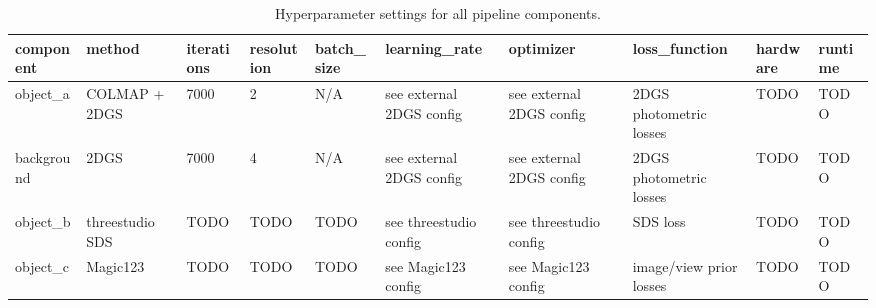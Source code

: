 \begin{table}[htbp]
\centering
\small
\begin{tabular}{llllllllll}
\hline
component & method & iterations & resolution & batch\_size & learning\_rate & optimizer & loss\_function & hardware & runtime \\
\hline
object\_a & COLMAP + 2DGS & 7000 & 2 & N/A & see external 2DGS config & see external 2DGS config & 2DGS photometric losses & TODO & TODO \\
background & 2DGS & 7000 & 4 & N/A & see external 2DGS config & see external 2DGS config & 2DGS photometric losses & TODO & TODO \\
object\_b & threestudio SDS & TODO & TODO & TODO & see threestudio config & see threestudio config & SDS loss & TODO & TODO \\
object\_c & Magic123 & TODO & TODO & TODO & see Magic123 config & see Magic123 config & image/view prior losses & TODO & TODO \\
\hline
\end{tabular}
\caption{Hyperparameter settings for all pipeline components.}
\label{tab:hyperparameters}
\end{table}
